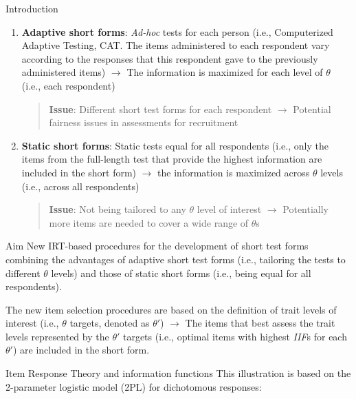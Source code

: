 \documentclass[final,t]{beamer}
\begin{document}
\begin{frame}
\begin{columns}[t]
\begin{column}{.45\linewidth}
\begin{block}{\centering Introduction}
	\begin{enumerate}
		\item \textbf{Adaptive short forms}: \emph{Ad-hoc} tests for each person (i.e., Computerized Adaptive Testing, CAT. The items administered to each respondent vary according to the responses that this respondent gave to the previously administered items) $\rightarrow$ The information is maximized for each level of $\theta$ (i.e., each respondent)
		
		\begin{quote}
			\textbf{Issue}: Different short test forms for each respondent $\rightarrow$ Potential fairness issues in assessments for recruitment
		\end{quote}
		
		\item  \textbf{Static short forms}: Static tests equal for all respondents (i.e., only the items from the full-length test that provide the highest information are included in the short form) $\rightarrow$ the information is maximized across $\theta$ levels (i.e., across all respondents)
		
		\begin{quote}
			\textbf{Issue}: Not being tailored to any $\theta$ level of interest $\rightarrow$ Potentially more items are needed to  cover a wide range of $\theta$s
		\end{quote}
	\end{enumerate}
\end{block}    

\begin{block}{\centering Aim}
	New IRT-based procedures for the development of short test forms combining the advantages of adaptive short test forms (i.e., tailoring the tests to different $\theta$ levels) and  those of static short forms (i.e., being equal for all respondents). 
	
	The new item selection procedures are based on the definition of trait levels of interest (i.e., $\theta$ targets, denoted as $\theta'$) $\rightarrow$  The items that best assess the trait levels represented by the $\theta'$ targets (i.e., optimal items with highest \emph{IIF}s for each $\theta'$) are included in the short form.

\end{block}

\begin{block}{\centering Item Response Theory and information functions}
	This illustration is based on the 2-parameter logistic model (2PL) for dichotomous responses: 
	

\end{block}
\end{column}
\end{columns}
\end{frame}
\end{document}
